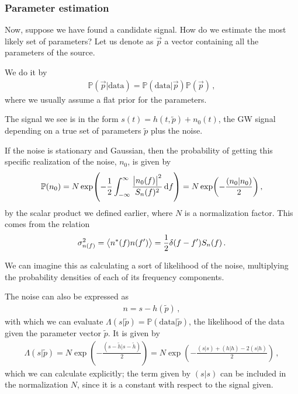 \documentclass[main.tex]{subfiles}
\begin{document}
\subsubsection{Parameter estimation}


Now, suppose we have found a candidate signal. How do we estimate the most likely set of parameters?
Let us denote as \(\vec{p}\) a vector containing all the parameters of the source.

We do it by 
%
\begin{align}
\mathbb{P}(\vec{p} | \text{data}) = \mathbb{P} (\text{data} | \vec{p}) \mathbb{P} (\vec{p})
\,,
\end{align}
%
where we usually assume a flat prior for the parameters.

The signal we see is in the form \(s(t) = h (t, \widetilde{p}) + n_0 (t)\), the GW signal depending on a true set of parameters \(\widetilde{p}\) plus the noise. 

If the noise is stationary and Gaussian, then the probability of getting this specific realization of the noise, \(n_0 \), is given by
%
\begin{align}
\mathbb{P}(n_0 ) = N \exp( - \frac{1}{2} \int_{- \infty }^{ \infty } \frac{\abs{n_0 (f)}^2}{S_n(f)^2} \dd{f}) = N \exp( -\frac{(n_0 | n_0 )}{2})
\,,
\end{align}
%
by the scalar product we defined earlier, where \(N\) is a normalization factor. 
This comes from the relation 
%
\begin{align}
\sigma^2_{n(f)} = \expval{n^{*}(f) n(f')} = \frac{1}{2} \delta (f - f') S_n (f)
\,.
\end{align}

We can imagine this as calculating a sort of likelihood of the noise, multiplying the probability densities of each of its frequency components.

The noise can also be expressed as
%
\begin{align}
n = s - h (\widetilde{p}) 
\,,
\end{align}
%
with which we can evaluate \(\Lambda (s | \widetilde{p}) = \mathbb{P}(\text{data} | \widetilde{p})\), the likelihood of the data given the parameter vector \(\widetilde{p}\).  
It is given by
%
\begin{align}
\Lambda (s| \widetilde{p})
= N \exp( -\frac{(s - \widetilde{h} | s - \widetilde{h})}{2})
= N \exp(- \frac{(s | s) + (h | h) - 2 (s | h)}{2})
\,,
\end{align}
%
which we can calculate explicitly;
the term given by \((s | s)\) can be included in the normalization \(N\), since it is a constant with respect to the signal given.
\end{document}
